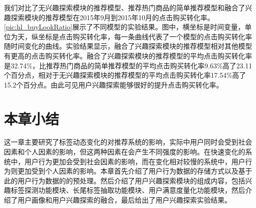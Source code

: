   我们对比了无兴趣探索模块的推荐模型、推荐热门商品的简单推荐模型和融合了兴趣探索模块的推荐模型在2015年9月到2015年10月的点击购买转化率。\autoref{pic:hl_buyLookRatio}展示了不同模型的实验结果。图中，横坐标是时间变量，单位为天，纵坐标是点击购买转化率，每一条曲线代表了一个模型的点击购买转化率随时间变化的曲线。实验结果显示，融合了兴趣探索模块的推荐模型相对其他模型有更高的点击购买转化率。融合了兴趣探索模块的推荐模型的平均点击购买转化率是32.74\%，比推荐热门商品的简单推荐模型的平均点击购买转化率9.63\%高了23.11个百分点，相对于无兴趣探索模块的推荐模型的平均点击购买转化率17.54\%高了15.2个百分点。由此可见用户兴趣探索能够很好的提升点击购买转化率。
  \begin{figure}
  \centering
    \label{pic:hl_buyLookRatio}
  \end{figure}

\section{本章小结}
这一章主要研究了标签动态变化的对推荐系统的影响，实际中用户同时会受到社会因素和个人因素的影响，但这两种因素在会产生不同强度的影响。在快速变化的系统中，用户行为更加会受到社会因素的影响，而在变化相对较慢的系统中，用户行为则更加受到个人因素的影响。本章首先介绍了用户行为数据的存储方式以及基于此的用户行为数据的的预处理。然后介绍了用户兴趣探索模块的组成内容，包括兴趣标签探测功能模块、长尾标签抽取功能模块、用户满意度量化功能模块，然后介绍了用户画像和用户兴趣探索的融合，最后给出了用户兴趣探索实验结果。